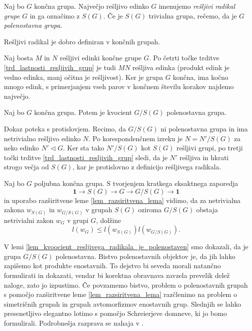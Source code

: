 \begin{definicija}
\label{def_resljiv_radikal}
Naj bo $G$ končna grupa. Največjo rešljivo edinko $G$ imenujemo \emph{rešljivi radikal grupe $G$} in ga označimo z $S(G)$. Če je $S(G)$ trivialna grupa, rečemo, da je $G$ \emph{polenostavna grupa}.
\end{definicija}
\begin{lema}
\label{lem_dobra_definiranost_resljivega_radikala}
Rešljivi radikal je dobro definiran v končnih grupah.
\end{lema}
\begin{dokaz}
    Naj bosta $M$ in $N$ rešljivi edinki končne grupe $G$. Po četrti točke trditve \ref{trd_lastnosti_resljivih_grup} je tudi $MN$ rešljiva edinka (produkt edink je vedno edinka, manj očitna je rešljivost). Ker je grupa $G$ končna, ima kočno mnogo edink,
    s primerjanjem vseh parov v končnem številu korakov najdemo največjo. 
\end{dokaz}

\begin{lema}
\label{lem_kvoocient_resljivega_radikala_je_polenostaven}
Naj bo $G$ končna grupa. Potem je kvocient $G / S(G)$ polenostavna grupa. 
\end{lema}
\begin{dokaz}
    Dokaz poteka s protislovjem. Recimo, da $G / S(G)$ ni polenostavna grupa in ima netrivialno rešljivo edinko $N$. Po korespondenčnem izreku je $N = N' / S(G)$ za neko edinko $N' \triangleleft G$.
    Ker sta tako $N' / S(G)$ kot $S(G)$ rešljivi grupi, po tretji točki trditve \ref{trd_lastnosti_resljivih_grup} sledi, da je $N'$ rešljiva in hkrati strogo večja od $S(G)$, kar je protislovno z definicijo rešljivega radikala.
\end{dokaz}

Naj bo $G$ poljubna končna grupa. S tvorjenjem kratkega eksaktnega zaporedja \begin{equation*}
\mathbf{1} \to S(G) \to G \to  G / S(G) \to  \mathbf{1}
\end{equation*}  
in uporabo razširitvene leme \ref{lem_razsiritvena_lema} vidimo, da za netrivialna zakona $w_{S(G)}$ in $w_{G / S(G)}$ v grupah $S(G)$ oziroma $G / S(G)$ obstaja netrivialni zakon $w_G$ v grupi $G$, dolžine \begin{equation*}
l(w_G) \le  l(w_{S(G)}) l (w_{G / S(G)}).
\end{equation*}  


V lemi \ref{lem_kvoocient_resljivega_radikala_je_polenostaven} smo dokazali, da je grupa $G / S(G)$ polenostavna. Bistvo polenostavnih objektov je, da jih lahko zapišemo kot produkte enostavnih.
To dejstvo bi seveda morali natančno formulirati in dokazati, vendar bi korektna obravnava zavzela prevelik delež naloge, zato jo izpustimo.
Če povzamemo bistvo, problem o polenostavnih grupah s pomočjo razširitvene leme \ref{lem_razsiritvena_lema} razčlenimo na problem o simetričnih grupah in grupah avtomorfizmov enostavnih grup. Slednjih se lahko presenetljivo elegantno lotimo s pomočjo Schreierjeve domneve, ki jo bomo formulirali.
Podrobnešja razprava se nahaja v \cite[28--31]{Schneider_2016}.  

